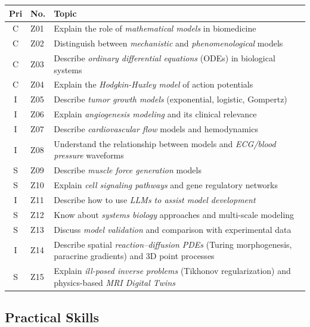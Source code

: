 \documentclass[11pt,a4paper]{article}
\begin{document}
\begin{longtable}{@{}clp{9cm}@{}}
\toprule
\textbf{Pri} & \textbf{No.} & \textbf{Topic} \\
\midrule
\endfirsthead
\midrule
\endhead
\midrule
\endfoot
\bottomrule
\endlastfoot
C & Z01 & Explain the role of \emph{mathematical models} in biomedicine \\
C & Z02 & Distinguish between \emph{mechanistic} and \emph{phenomenological} models \\
C & Z03 & Describe \emph{ordinary differential equations} (ODEs) in biological systems \\
C & Z04 & Explain the \emph{Hodgkin-Huxley model} of action potentials \\
I & Z05 & Describe \emph{tumor growth models} (exponential, logistic, Gompertz) \\
I & Z06 & Explain \emph{angiogenesis modeling} and its clinical relevance \\
I & Z07 & Describe \emph{cardiovascular flow} models and hemodynamics \\
I & Z08 & Understand the relationship between models and \emph{ECG/blood pressure} waveforms \\
S & Z09 & Describe \emph{muscle force generation} models \\
S & Z10 & Explain \emph{cell signaling pathways} and gene regulatory networks \\
I & Z11 & Describe how to use \emph{LLMs to assist model development} \\
S & Z12 & Know about \emph{systems biology} approaches and multi-scale modeling \\
S & Z13 & Discuss \emph{model validation} and comparison with experimental data \\
I & Z14 & Describe spatial \emph{reaction--diffusion PDEs} (Turing morphogenesis, paracrine gradients) and 3D point processes \\
S & Z15 & Explain \emph{ill-posed inverse problems} (Tikhonov regularization) and physics-based \emph{MRI Digital Twins} \\
\end{longtable}

\subsection{Practical Skills}
\end{document}
